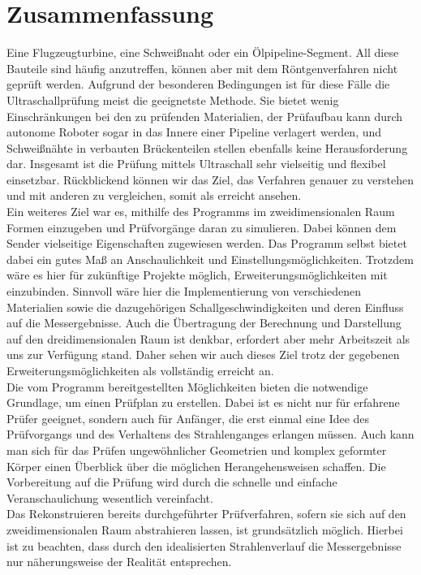 \documentclass[reducespace,stylepage,semiarbeit]{spezidoc}
\begin{document}
\section{Zusammenfassung}
Eine Flugzeugturbine, eine Schweißnaht oder ein Ölpipeline-Segment.
All diese Bauteile sind häufig anzutreffen, können aber mit dem Röntgenverfahren nicht geprüft werden.
Aufgrund der besonderen Bedingungen ist für diese Fälle die Ultraschallprüfung meist die geeignetste Methode.
Sie bietet wenig Einschränkungen bei den zu prüfenden Materialien, der Prüfaufbau kann durch autonome Roboter sogar in das Innere einer Pipeline verlagert werden, und Schweißnähte in verbauten Brückenteilen stellen ebenfalls keine Herausforderung dar.
Insgesamt ist die Prüfung mittels Ultraschall sehr vielseitig und flexibel einsetzbar.
Rückblickend können wir das Ziel, das Verfahren genauer zu verstehen und mit anderen zu vergleichen, somit als erreicht ansehen.\\
Ein weiteres Ziel war es, mithilfe des Programms im zweidimensionalen Raum Formen einzugeben und Prüfvorgänge daran zu simulieren. 
Dabei können dem Sender vielseitige Eigenschaften zugewiesen werden.
Das Programm selbst bietet dabei ein gutes Maß an Anschaulichkeit und Einstellungsmöglichkeiten.
Trotzdem wäre es hier für zukünftige Projekte möglich, Erweiterungsmöglichkeiten mit einzubinden.
Sinnvoll wäre hier die Implementierung von verschiedenen Materialien sowie die dazugehörigen 
Schallgeschwindigkeiten und deren Einfluss auf die Messergebnisse. Auch die Übertragung der Berechnung und Darstellung auf den dreidimensionalen Raum ist denkbar, erfordert aber mehr Arbeitszeit als uns zur Verfügung stand.
Daher sehen wir auch dieses Ziel trotz der gegebenen Erweiterungsmöglichkeiten als vollständig erreicht an.\\
Die vom Programm bereitgestellten Möglichkeiten bieten die notwendige Grundlage, um einen Prüfplan zu erstellen. 
Dabei ist es nicht nur für erfahrene Prüfer geeignet, sondern auch für Anfänger, die erst einmal eine Idee des Prüfvorgangs und des Verhaltens des Strahlenganges erlangen müssen.
Auch kann man sich für das Prüfen ungewöhnlicher Geometrien und komplex geformter Körper einen Überblick über die möglichen Herangehensweisen schaffen. Die Vorbereitung auf die Prüfung wird durch die schnelle und einfache Veranschaulichung wesentlich vereinfacht. \\
Das Rekonstruieren bereits durchgeführter Prüfverfahren, sofern sie sich auf den zweidimensionalen Raum abstrahieren lassen, ist grundsätzlich möglich. 
Hierbei ist zu beachten, dass durch den idealisierten Strahlenverlauf die Messergebnisse nur näherungsweise der Realität entsprechen.
\end{document}
